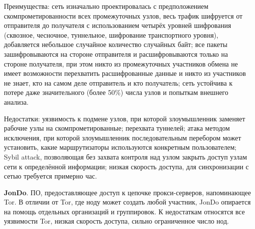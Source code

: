 Преимущества: сеть изначально проектировалась с предположением скомпрометированности  всех промежуточных узлов, \cite{I2P2} %
весь трафик шифруется от отправителя до получателя с использованием четырёх уровней шифрования (сквозное, чесночное, туннельное,  шифрование транспортного уровня), добавляется небольшое случайное количество случайных байт; все пакеты зашифровываются на стороне отправителя и расшифровываются только на стороне получателя, при этом никто из промежуточных участников обмена не имеет возможности перехватить расшифрованные данные и никто из участников не знает, кто на самом деле отправитель и кто получатель; сеть устойчива к потере даже значительного (более 50\%) числа узлов и попыткам внешнего анализа.

Недостатки: уязвимость к подмене узлов, при которой  злоумышленник заменяет рабочие узлы на скомпрометированные; перехвата туннелей; атака методом исключения, при которой злоумышленник последовательным перебором может установить, какие маршрутизаторы используются конкретным пользователем; %
Sybil attack, позволяющая без захвата контроля над узлом закрыть доступ узлам сети 	к определённой информации; низкая скорость доступа, для синхронизации с сетью требуется примерно час.

\textbf{JonDo}. ПО, предоставляющее доступ к цепочке прокси-серверов, напоминающее Tor. В отличии  от  Tor, где ноду может создать любой участник, JonDo опирается на помощь отдельных организаций и группировок. К недостаткам относятся все уязвимости Tor, низкая скорость доступа, сильно ограниченное число нод.

